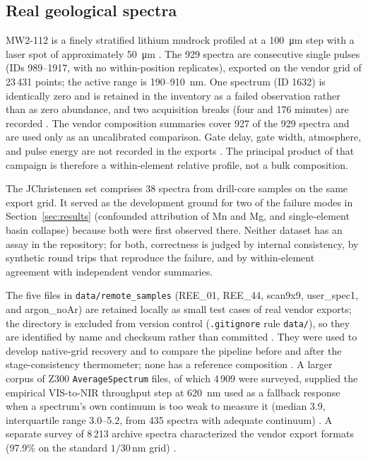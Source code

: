 \subsection{Real geological spectra}

MW2-112 is a finely stratified lithium mudrock profiled at a \SI{100}{\micro\metre} step with a laser spot of approximately \SI{50}{\micro\metre} %
. The 929 spectra are consecutive single pulses (IDs 989--1917, with no within-position replicates), exported on the vendor grid of 23\,431 points; the active range is 190--\SI{910}{\nano\metre}. One spectrum (ID 1632) is identically zero and is retained in the inventory as a failed observation rather than as zero abundance, and two acquisition breaks (four and 176 minutes) are recorded %
. The vendor composition summaries cover 927 of the 929 spectra and are used only as an uncalibrated comparison. Gate delay, gate width, atmosphere, and pulse energy are not recorded in the exports %
. The principal product of that campaign is therefore a within-element relative profile, not a bulk composition.

The JChristensen set comprises 38 spectra from drill-core samples on the same export grid. It served as the development ground for two of the failure modes in Section~\ref{sec:results} (confounded attribution of Mn and Mg, and single-element basin collapse) because both were first observed there. Neither dataset has an assay in the repository; for both, correctness is judged by internal consistency, by synthetic round trips that reproduce the failure, and by within-element agreement with independent vendor summaries.

The five files in \texttt{data/remote\_samples} (REE\_01, REE\_44, scan9x9, user\_spec1, and argon\_noAr) are retained locally as small test cases of real vendor exports; the directory is excluded from version control (\texttt{.gitignore} rule \texttt{data/}), so they are identified by name and checksum rather than committed %
. They were used to develop native-grid recovery and to compare the pipeline before and after the stage-consistency thermometer; none has a reference composition %
. A larger corpus of Z300 \texttt{AverageSpectrum} files, of which 4\,909 were surveyed, supplied the empirical VIS-to-NIR throughput step at \SI{620}{\nano\metre} used as a fallback response when a spectrum's own continuum is too weak to measure it (median 3.9, interquartile range 3.0--5.2, from 435 spectra with adequate continuum) %
. A separate survey of 8\,213 archive spectra characterized the vendor export formats (97.9\% on the standard $1/30$\,\si{\nano\metre} grid) %
.


